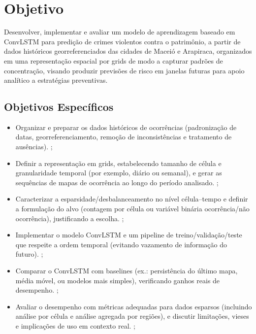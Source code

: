 \section{Objetivo}
\label{Sec:Objetivo}

Desenvolver, implementar e avaliar um modelo de aprendizagem  baseado em ConvLSTM para predição de crimes violentos contra o patrimônio, a partir de dados históricos georreferenciados das cidades de Maceió e Arapiraca, organizados em uma representação espacial por grids de modo a capturar padrões de concentração, visando produzir previsões de risco em janelas futuras para apoio analítico a estratégias preventivas.

\subsection{\textbf{Objetivos Específicos}}
\label{Sec:ObjetivoEspecifico}
\begin{itemize}
  \item Organizar e preparar os dados históricos de ocorrências (padronização de datas, georreferenciamento, remoção de inconsistências e tratamento de ausências). ;
  \item Definir a representação em grids, estabelecendo tamanho de célula e granularidade temporal (por exemplo, diário ou semanal), e gerar as sequências de mapas de ocorrência ao longo do período analisado. ;
  \item Caracterizar a esparsidade/desbalanceamento no nível célula–tempo e definir a formulação do alvo (contagem por célula ou variável binária ocorrência/não ocorrência), justificando a escolha. ;
  \item Implementar o modelo ConvLSTM e um pipeline de treino/validação/teste que respeite a ordem temporal (evitando vazamento de informação do futuro). ;
  \item Comparar o ConvLSTM com baselines (ex.: persistência do último mapa, média móvel, ou modelos mais simples), verificando ganhos reais de desempenho. ;
  \item Avaliar o desempenho com métricas adequadas para dados esparsos (incluindo análise por célula e análise agregada por regiões), e discutir limitações, vieses e implicações de uso em contexto real. ;
\end{itemize}

